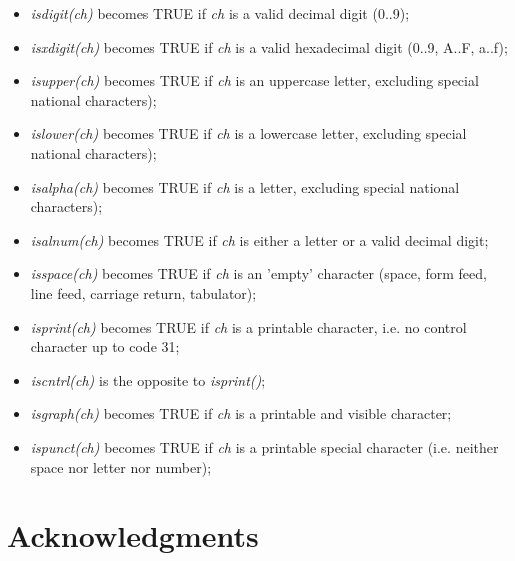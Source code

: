 \documentclass[12pt,twoside]{report}
\begin{document}
\begin{itemize}
\item{{\em isdigit(ch)} becomes TRUE if {\em ch} is a valid decimal
      digit (0..9);}
\item{{\em isxdigit(ch)} becomes TRUE if {\em ch} is a valid hexadecimal
      digit (0..9, A..F, a..f);}
\item{{\em isupper(ch)} becomes TRUE if {\em ch} is an uppercase
      letter, excluding special national characters);}
\item{{\em islower(ch)} becomes TRUE if {\em ch} is a lowercase
      letter, excluding special national characters);}
\item{{\em isalpha(ch)} becomes TRUE if {\em ch} is a letter, excluding
      special national characters);}
\item{{\em isalnum(ch)} becomes TRUE if {\em ch} is either a letter or
      a valid decimal digit;}
\item{{\em isspace(ch)} becomes TRUE if {\em ch} is an 'empty' character
      (space, form feed, line feed, carriage return, tabulator);}
\item{{\em isprint(ch)} becomes TRUE if {\em ch} is a printable character,
      i.e. no control character up to code 31;}
\item{{\em iscntrl(ch)} is the opposite to {\em isprint()};}
\item{{\em isgraph(ch)} becomes TRUE if {\em ch} is a printable and
      visible character;}
\item{{\em ispunct(ch)} becomes TRUE if {\em ch} is a printable special
      character (i.e. neither space nor letter nor number);}
\end{itemize}


\cleardoublepage
\chapter{Acknowledgments}
\end{document}
